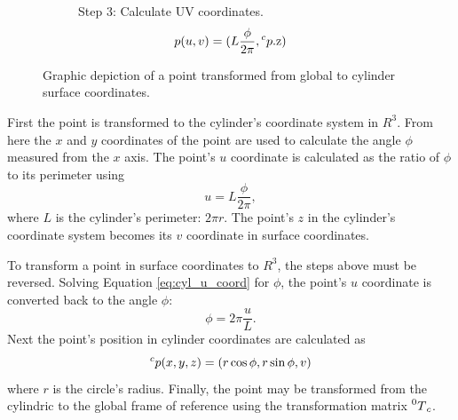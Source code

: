 \begin{figure}[htb]
\begin{subfigure}[b]{0.3\textwidth}
		\centering
{}
		\caption{%
Step 3: Calculate UV coordinates.
\begin{equation*}
	p(u,v) = (L \frac{\phi}{2\pi}, \prescript{c}{}p\text{.z})
\end{equation*}
}
	\end{subfigure}
	\caption{Graphic depiction of a point transformed from global to cylinder surface coordinates.}
	\label{fig:gl_ccyl_transform_steps}
\end{figure}

First the point is transformed to the cylinder's coordinate system in $R^3$.
From here the $x$ and $y$ coordinates of the point are used to calculate the angle $\phi$ measured from the $x$ axis.
The point's $u$ coordinate is calculated as the ratio of $\phi$ to its perimeter using
\begin{equation}\label{eq:cyl_u_coord}
	u = L \frac{\phi}{2\pi},
\end{equation}
where $L$ is the cylinder's perimeter: $2\pi r$.
The point's $z$ in the cylinder's coordinate system becomes its $v$ coordinate in surface coordinates.

To transform a point in surface coordinates to $R^3$, the steps above must be reversed.
Solving Equation \ref{eq:cyl_u_coord} for $\phi$, the point's $u$ coordinate is converted back to the angle $\phi$:
\begin{equation*}
	\phi = 2\pi \frac{u}{L}.
\end{equation*}
Next the point's position in cylinder coordinates are calculated as
\begin{equation*}
	\prescript{c}{}p(x,y,z) = (r \cos \phi, r \sin \phi, v)
\end{equation*}
where $r$ is the circle's radius.
Finally, the point may be transformed from the cylindric to the global frame of reference using the transformation matrix $\prescript{0}{}T_c$.

